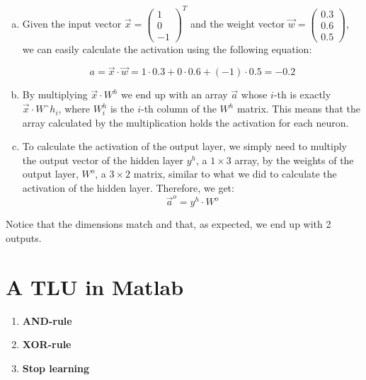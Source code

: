 \documentclass{article}
\begin{document}
\begin{enumerate}[a)]
\item Given the input vector $\vec{x} = \displaystyle \left(
        \begin{array}{c}
          1 \\
          0 \\
          -1
        \end{array}
      \right)^T$
      and the weight vector $\vec{w} = \displaystyle \left(
        \begin{array}{c}
          0.3 \\
          0.6 \\
          0.5
        \end{array}
      \right)$, we can easily calculate the activation using the following equation:
      
      \begin{equation}
      a = \vec{x} \cdot \vec{w} = 1 \cdot 0.3 + 0 \cdot 0.6 + (-1) \cdot 0.5 = -0.2
      \end{equation}
      
\item By multiplying $\vec{x} \cdot W^h$ we end up with an array $\vec{a}$ whose $i$-th is exactly $\vec{x} \cdot Wˆh_i$, where $W^h_i$ is the $i$-th column of the $W^h$ matrix. This means that the array calculated by the multiplication holds the activation for each neuron.

\item To calculate the activation of the output layer, we simply need to multiply the output vector of the hidden layer $y^h$, a $1 \times 3$ array, by the weights of the output layer, $W^o$, a $3 \times 2$ matrix, similar to what we did to calculate the activation of the hidden layer. Therefore, we get:
    \begin{equation}
        \vec{a}^o = y^h \cdot W^o
    \end{equation}  
\end{enumerate}
Notice that the dimensions match and that, as expected, we end up with 2 outputs.

\section{A TLU in Matlab}
\begin {enumerate}
\item \textbf {AND-rule}
  

\item \textbf {XOR-rule}
  

\item \textbf {Stop learning}
 
\end {enumerate}
\end{document}
